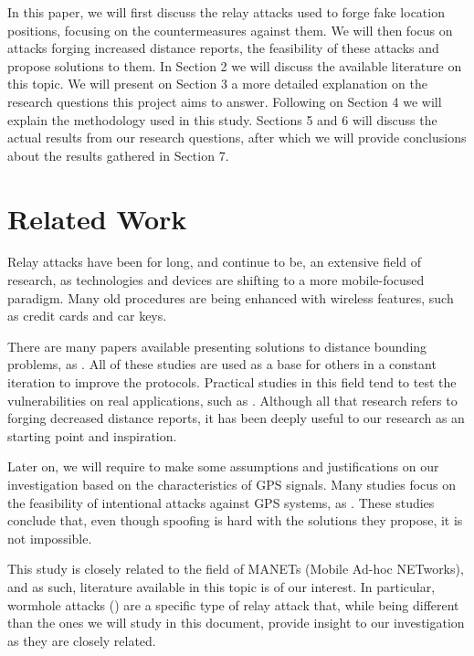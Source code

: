 \documentclass{article}
\begin{document}
In this paper, we will first discuss the relay attacks used to forge fake location positions, focusing on the countermeasures against them. We will then focus on attacks forging increased distance reports, the feasibility of these attacks and propose solutions to them. In Section 2 we will discuss the available literature on this topic. We will present on Section 3 a more detailed explanation on the research questions this project aims to answer. Following on Section 4 we will explain the methodology used in this study. Sections 5 and 6 will discuss the actual results from our research questions, after which we will provide conclusions about the results gathered in Section 7.

\section{Related Work}

Relay attacks have been for long, and continue to be, an extensive field of research, as technologies and devices are shifting to a more mobile-focused paradigm. Many old procedures are being enhanced with wireless features, such as credit cards and car keys.

There are many papers available presenting solutions to distance bounding problems, as \cite{brands1994distance, tu2007rfid, rasmussen2010realization}. All of these studies are used as a base for others in a constant iteration to improve the protocols. Practical studies in this field tend to test the vulnerabilities on real applications, such as \cite{francillon2011relay, francis2010practical, hancke2005practical, markantonakis2012practical, vandenbreekel2014relay}. Although all that research refers to forging decreased distance reports, it has been deeply useful to our research as an starting point and inspiration.

Later on, we will require to make some assumptions and justifications on our investigation based on the characteristics of GPS signals. Many studies focus on the feasibility of intentional attacks against GPS systems, as \cite{warner2003gps, wen2005countermeasures, jafarnia2012gps}. These studies conclude that, even though spoofing is hard with the solutions they propose, it is not impossible.

This study is closely related to the field of MANETs (Mobile Ad-hoc NETworks), and as such, literature available in this topic is of our interest. In particular, wormhole attacks (\cite{hu2006wormhole, maheshwari2007detecting}) are a specific type of relay attack that, while being different than the ones we will study in this document, provide insight to our investigation as they are closely related.
\end{document}
